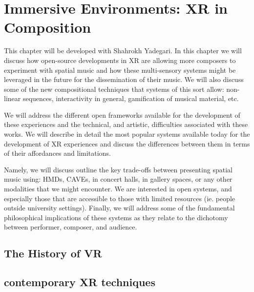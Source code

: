 \chapter{Immersive Environments: XR in Composition}




This chapter will be developed with Shahrokh Yadegari. In this chapter we will discuss how open-source developments in XR are allowing more composers to experiment with spatial music and how these multi-sensory systems might be leveraged in the future for the dissemination of their music. We will also discuss some of the new compositional techniques that systems of this sort allow: non-linear sequences, interactivity in general, gamification of musical material, etc. 

We will address the different open frameworks available for the development of these experiences and the technical, and artistic, difficulties associated with these works. We will describe in detail the most popular systems available today for the development of XR experiences and discuss the differences between them in terms of their affordances and limitations.

Namely, we will discuss outline the key trade-offs between presenting spatial music using: HMDs, CAVEs, in concert halls, in gallery spaces, or any other modalities that we might encounter. We are interested in open systems, and especially those that are accessible to those with limited resources (ie. people outside university settings). Finally, we will address some of the fundamental philosophical implications of these systems as they relate to the dichotomy between performer, composer, and audience. 

\section{The History of VR}

\section{contemporary XR techniques}

